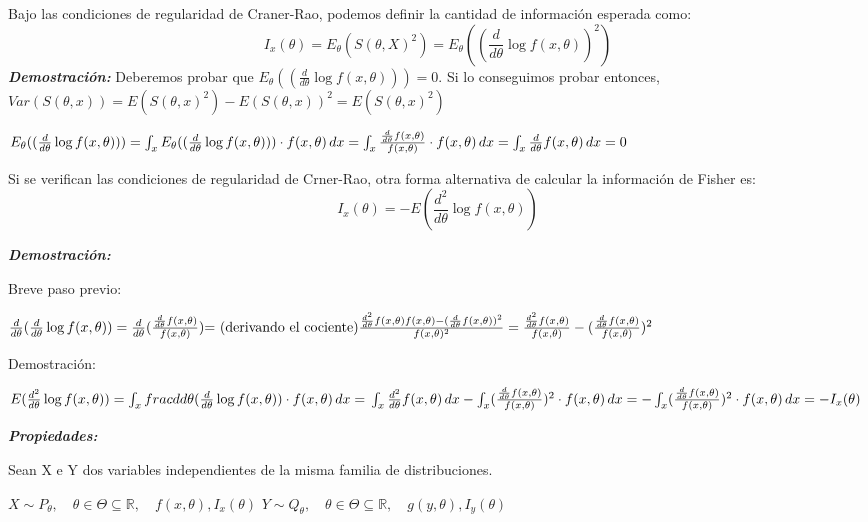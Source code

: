 Bajo las condiciones de regularidad de Craner-Rao, podemos definir la cantidad
de información esperada como:
\[
I_x(\theta)=E_\theta(S(\theta,X)^2)=E_\theta((\frac{d}{d \theta} \log f(x,\theta))^2)
\]
\textbf{\textit{Demostración:}}
Deberemos probar que $E_\theta((\frac{d}{d \theta} \log f(x,\theta)))=0$.
Si lo conseguimos probar entonces, $Var(S(\theta,x))=E(S(\theta,x)^2)
-E(S(\theta,x))^2=E(S(\theta,x)^2)$

\(
    E_\theta((\frac{d}{d \theta} \log f(x,\theta)))=
    \int_{x} E_\theta((\frac{d}{d \theta} \log f(x,\theta))) \cdot f(x,\theta) \,dx 
    =\int_{x} \frac{\frac{d}{d \theta} f(x,\theta)}{f(x,\theta)} \cdot f(x,\theta) \,dx 
    \\=\int_{x} \frac{d}{d \theta} f(x,\theta) \,dx = 0
\)

Si se verifican las condiciones de regularidad de Crner-Rao, otra forma alternativa de calcular
la información de Fisher es:
\[
I_x(\theta)=-E(\frac{d^2}{d \theta} \log f(x,\theta))
\]

\textbf{\textit{Demostración:}}

Breve paso previo:


\(
\frac{d}{d \theta} (\frac{d}{d \theta} \log f(x,\theta))=
\frac{d}{d \theta} (\frac{\frac{d}{d \theta} f(x,\theta)}{f(x,\theta)})
\text{= (derivando el cociente)}
\frac{\frac{d^2}{d \theta} f(x,\theta) f(x,\theta) - (\frac{d}{d \theta} f(x,\theta))^2}{f(x,\theta)^2}
\\ = \frac{\frac{d^2}{d \theta} f(x,\theta)}{f(x,\theta)} - (\frac{\frac{d}{d \theta} f(x,\theta)}{f(x,\theta)})^2
\)

Demostración:

\(
E(\frac{d^2}{d \theta} \log f(x,\theta))=
\int_{x} frac{d}{d \theta} (\frac{d}{d \theta} \log f(x,\theta)) \cdot f(x,\theta) \,dx = \\
\int_{x} \frac{d^2}{d \theta} f(x, \theta) \,dx - \int_{x} (\frac{\frac{d}{d \theta} f(x,\theta)}{f(x,\theta)})^2 \cdot f(x,\theta) \,dx  
= - \int_{x} (\frac{\frac{d}{d \theta} f(x,\theta)}{f(x,\theta)})^2 \cdot f(x,\theta) \,dx  
= - I_x(\theta)
\)

\textbf{\textit{Propiedades:}}

Sean X e Y dos variables independientes de la misma familia de distribuciones.

$
X \sim P_\theta, \quad \theta \in \Theta \subseteq \mathbb{R}, \quad f(x,\theta), I_x(\theta)
$
$
Y \sim Q_\theta, \quad \theta \in \Theta \subseteq \mathbb{R}, \quad g(y,\theta), I_y(\theta)
$
